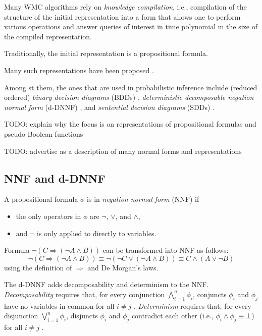 Many WMC algorithms rely on \emph{knowledge compilation}, i.e., compilation of the structure of the initial representation into a form that allows one to perform various operations and answer queries of interest in time polynomial in the size of the compiled representation.

Traditionally, the initial representation is a propositional formula.

Many such representations have been proposed \citep{DBLP:journals/jair/DarwicheM02}.

Among st them, the ones that are used in probabilistic inference include (reduced ordered) \emph{binary decision diagrams} (BDDs) \citep{DBLP:journals/tc/Bryant86}, \emph{deterministic decomposable negation normal form} (d-DNNF) \citep{DBLP:journals/jancl/Darwiche01}, and \emph{sentential decision diagrams} (SDDs) \citep{DBLP:conf/ijcai/Darwiche11}.

TODO: explain why the focus is on representations of propositional formulas and pseudo-Boolean functions

TODO: advertise \citep{DBLP:journals/jair/DarwicheM02} as a description of many normal forms and representations

\subsection{NNF and d-DNNF}

\begin{definition}
  A propositional formula $\phi$ is in \emph{negation normal form} (NNF) if
  \begin{itemize}
  \item the only operators in $\phi$ are $\neg$, $\lor$, and $\land$,
  \item and $\neg$ is only applied to directly to variables.
  \end{itemize}
\end{definition}

\begin{example}
  Formula $\neg(C \Rightarrow (\neg A \land B))$ can be transformed into NNF as follows:
  \[
  \neg(C \Rightarrow (\neg A \land B)) \equiv \neg(\neg C \lor (\neg A \land B)) \equiv C \land (A \lor \neg B)
  \]
  using the definition of $\Rightarrow$ and De Morgan's laws.
\end{example}

\begin{definition}
  The d-DNNF adds decomposability and determinism to the NNF. \emph{Decomposability} requires that, for every conjunction $\bigwedge_{i=1}^n \phi_i$, conjuncts $\phi_i$ and $\phi_j$ have no variables in common for all $i \ne j$ \citep{DBLP:conf/ijcai/Darwiche99,DBLP:journals/jacm/Darwiche01}. \emph{Determinism} requires that, for every disjunction $\bigvee_{i=1}^n \phi_i$, disjuncts $\phi_i$ and $\phi_j$ contradict each other (i.e., $\phi_i \land \phi_j \equiv \bot$) for all $i \ne j$ \citep{DBLP:journals/jancl/Darwiche01}.
\end{definition}

